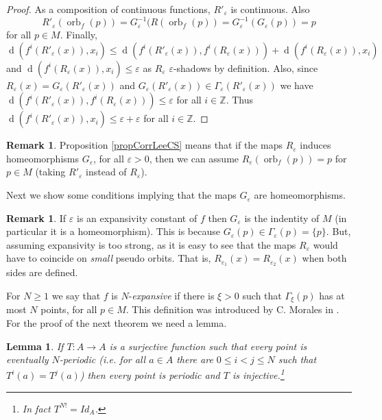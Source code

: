 \documentclass[12pt]{amsart}
\theoremstyle{plain}
\newtheorem{lem}[thm]{Lemma}
\theoremstyle{definition}
\newtheorem{rmk}[thm]{Remark}
\theoremstyle{remark}
\DeclareMathOperator{\dist}{d}
\DeclareMathOperator{\orb}{orb}
\newcommand{\Z}{\mathbb Z}
\renewcommand{\epsilon}{\varepsilon}
\newcommand{\expc}{\xi}
\begin{document}
\begin{proof}
As a composition of continuous functions, $R'_\epsilon$ is continuous.
Also
$$R'_\epsilon(\orb_f(p))=
G_\epsilon^{-1}(R(\orb_f(p))
=
G_\epsilon^{-1}(G_\epsilon(p))=p
$$ for all $p\in M$.
Finally,
\[
 \dist(f^i(R'_\epsilon(x)),x_i)\leq
 \dist(f^i(R'_\epsilon(x)),f^i(R_\epsilon(x)))+
 \dist(f^i(R_\epsilon(x)),x_i)
\]
and $\dist(f^i(R_\epsilon(x)),x_i)\leq\epsilon$ as $R_\epsilon$ $\epsilon$-shadows by definition.
Also, since $R_\epsilon(x)=G_\epsilon(R'_\epsilon(x))$ and
$G_\epsilon(R'_\epsilon(x))\in\Gamma_\epsilon(R'_\epsilon(x))$
we have
$\dist(f^i(R'_\epsilon(x)),f^i(R_\epsilon(x)))\leq\epsilon$ for all $i\in\Z$.
Thus $\dist(f^i(R'_\epsilon(x)),x_i)\leq\epsilon+\epsilon$ for all $i\in\Z$.
\end{proof}

\begin{rmk}
	\label{rmkRepsPresOrb}
 Proposition \ref{propCorrLeeCS} means that if the maps $R_\epsilon$ induces homeomorphisms $G_\epsilon$, for all $\epsilon>0$, then we can assume $R_\epsilon(\orb_f(p))=p$ for $p\in M$ (taking $R'_\epsilon$ instead of $R_\epsilon$).
\end{rmk}

Next we show some conditions implying that the maps $G_\epsilon$ are homeomorphisms.

\begin{rmk}
 If $\epsilon$ is an expansivity constant of $f$ then $G_\epsilon$ is the indentity of $M$ (in particular it is a homeomorphism). This is because
 $G_\epsilon(p)\in\Gamma_\epsilon(p)=\{p\}$.
 But, assuming expansivity is too strong, as it is easy to see that the maps $R_\epsilon$ would have to coincide on \textit{small} pseudo orbits. That is, $R_{\epsilon_1}(x)=R_{\epsilon_2}(x)$ when both sides are defined.
\end{rmk}

For $N\geq 1$ we say that $f$ is $N$-\textit{expansive} if there is $\expc>0$ such that $\Gamma_\expc(p)$ has at most $N$ points, for all $p\in M$. This definition was introduced by C. Morales in \cite{Morales2012}.
For the proof of the next theorem we need a lemma.

\begin{lem}
\label{lemCombNsh}
 If $T\colon A\to A$ is a surjective function such that every point is eventually $N$-periodic (\textit{i.e.} for all $a\in A$ there are $0\leq i<j\leq N$ such that $T^i(a)=T^j(a)$) then
 every point is periodic and $T$ is injective.\footnote{In fact $T^{N!}=Id_A$.}
\end{lem}
\end{document}
